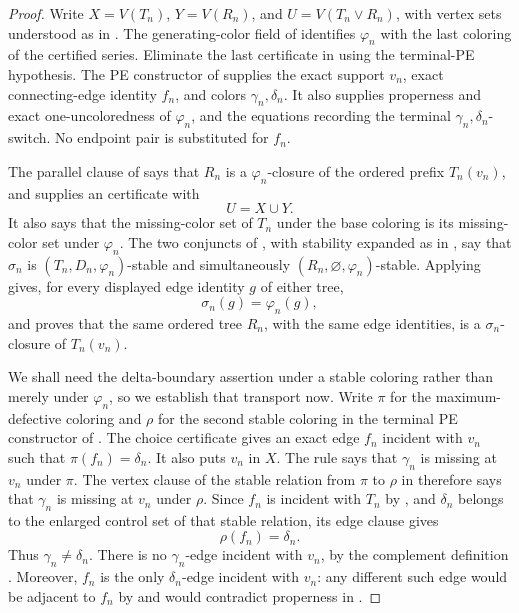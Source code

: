 \begin{proof}
Write $X=V(T_n)$, $Y=V(R_n)$, and
$U=V(T_n\vee R_n)$, with vertex sets understood as in
.  The generating-color field of
 identifies $\varphi_n$ with the last
coloring of the certified series.  Eliminate the last certificate in
 using the terminal-PE hypothesis.  The PE
constructor of  supplies the exact support
$v_n$, exact connecting-edge identity $f_n$, and colors
$\gamma_n,\delta_n$.  It also supplies properness and exact
one-uncoloredness of $\varphi_n$, and the equations recording the
terminal $\gamma_n,\delta_n$-switch.  No endpoint pair is substituted
for $f_n$.

The parallel clause of  says that $R_n$ is a
$\varphi_n$-closure of the ordered prefix $T_n(v_n)$, and supplies
an  certificate with
\[
                         U=X\cup Y.                       \tag{1}
\]
It also says that the missing-color set of $T_n$ under the base
coloring is its missing-color set under $\varphi_n$.
The two conjuncts of , with stability
expanded as in , say that
$\sigma_n$ is $(T_n,D_n,\varphi_n)$-stable and simultaneously
$(R_n,\varnothing,\varphi_n)$-stable.  Applying
 gives, for every displayed edge
identity $g$ of either tree,
\[
             \sigma_n(g)=\varphi_n(g),                    \tag{2}
\]
and proves that the same ordered tree $R_n$, with the same edge
identities, is a $\sigma_n$-closure of $T_n(v_n)$.

We shall need the delta-boundary assertion under a stable coloring rather
than merely under $\varphi_n$, so we establish that transport now.  Write
$\pi$ for the maximum-defective coloring and $\rho$ for the second stable
coloring in the terminal PE constructor of
.  The choice certificate
 gives an exact edge $f_n$ incident with
$v_n$ such that $\pi(f_n)=\delta_n$.  It also puts $v_n$ in $X$.  The rule
 says that $\gamma_n$ is missing at
$v_n$ under $\pi$.  The vertex clause of the stable relation from $\pi$
to $\rho$ in  therefore says that $\gamma_n$ is
missing at $v_n$ under $\rho$.  Since $f_n$ is incident with $T_n$ by
, and $\delta_n$ belongs to the enlarged
control set of that stable relation, its edge clause gives
\[
                       \rho(f_n)=\delta_n.                    \tag{2a}
\]
Thus $\gamma_n\ne\delta_n$.  There is no $\gamma_n$-edge incident with
$v_n$, by the complement definition .  Moreover,
$f_n$ is the only $\delta_n$-edge incident with $v_n$: any different such
edge would be adjacent to $f_n$ by  and would
contradict properness in .


\end{proof}
